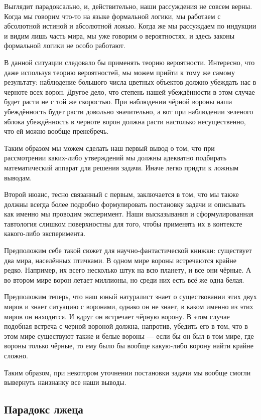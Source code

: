 Выглядит парадоксально, и, действительно, наши рассуждения не совсем верны. Когда мы говорим что-то на языке формальной логики, мы работаем с абсолютной истиной и абсолютной ложью. Когда же мы рассуждаем по индукции и видим лишь часть мира, мы уже говорим о вероятностях, и здесь законы формальной логики не особо работают.

В данной ситуации следовало бы применять теорию вероятности. Интересно, что даже используя теорию вероятностей, мы можем прийти к тому же самому результату: наблюдение большого числа цветных объектов должно убеждать нас в черноте всех ворон. Другое дело, что степень нашей убеждённости в этом случае будет расти не с той же скоростью. При наблюдении чёрной вороны наша убеждённость будет расти довольно значительно, а вот при наблюдении зеленого яблока убеждённость в черноте ворон должна расти настолько несущественно, что ей можно вообще пренебречь.

Таким образом мы можем сделать наш первый вывод о том, что при рассмотрении каких-либо утверждений мы должны адекватно подбирать математический аппарат для решения задачи. Иначе легко придти к ложным выводам.

Второй нюанс, тесно связанный с первым, заключается в том, что мы также должны всегда более подробно формулировать постановку задачи и описывать как именно мы проводим эксперимент. Наши высказывания и сформулированная тавтология слишком поверхностны для того, чтобы применять их в контексте какого-либо эксперимента.

Предположим себе такой сюжет для научно-фантастической книжки: существует два мира, населённых птичками. В одном мире вороны встречаются крайне редко. Например, их всего нес\-коль\-ко штук на всю планету, и все они чёрные. А во втором мире ворон летает миллионы, но среди них есть всё же одна белая.

Предположим теперь, что наш юный натуралист знает о существовании этих двух миров и знает ситуацию с воронами, однако он не знает, в каком именно из этих миров он находится. И вдруг он встречает чёрную ворону. В этом случае подобная встреча с черной вороной должна, напротив, убедить его в том, что в этом мире существуют также и белые вороны — если бы он был в том мире, где вороны только чёрные, то ему было бы вообще какую-либо ворону найти крайне сложно.

Таким образом, при некотором уточнении постановки задачи мы вообще смогли вывернуть наизнанку все наши выводы.

\subsection{Парадокс лжеца}


